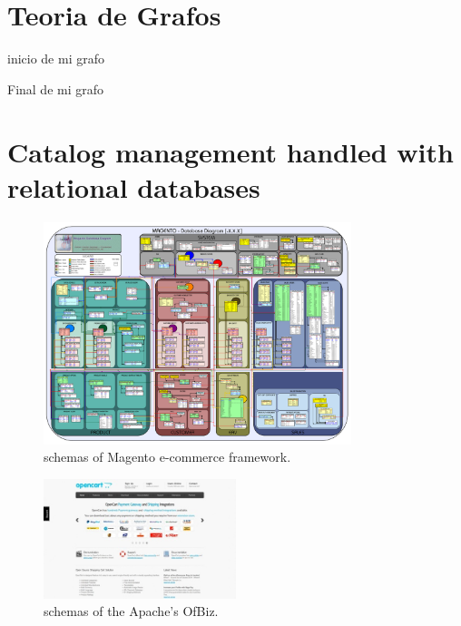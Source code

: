 
\appendix
\newpage

\chapter{Teoria de Grafos}\label{ap:apendice_graph_theory}
inicio de mi grafo \cite{book_introduction_graph_theory}

Final de mi grafo

\chapter{Catalog management handled with relational databases}\label{ap:apendice_ecommerce_catalog_relational}

\begin{figure}[h!]
	\centering
	\includegraphics[width=0.8\textwidth]{figuras/apendice/magento_sample_database_diagram.png}
	\caption{schemas of Magento e-commerce framework.}
	\label{ap:figure:catalog_magento}
\end{figure}

\begin{figure}[h!]
	\centering
	\includegraphics[width=0.5\textwidth]{figuras/apendice/openCartWebsite.jpg}
	\caption{schemas of the Apache's OfBiz.}
	\label{ap:figure:catalog_ofbiz}
\end{figure}

